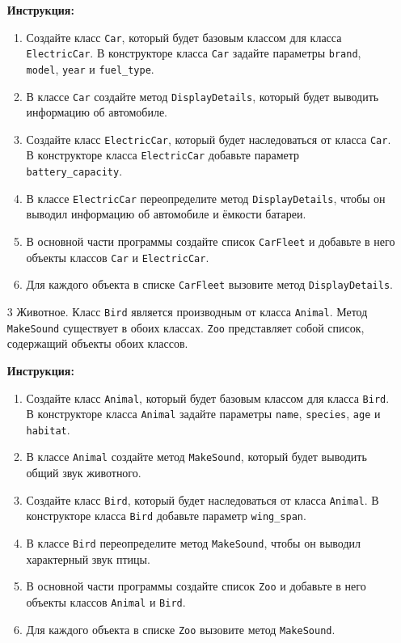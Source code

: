\begin{enumerate}
\textbf{Инструкция:}
\begin{enumerate}
    \item Создайте класс \texttt{Car}, который будет базовым классом для класса \texttt{ElectricCar}. В конструкторе класса \texttt{Car} задайте параметры \texttt{brand}, \texttt{model}, \texttt{year} и \texttt{fuel\_type}.
    \item В классе \texttt{Car} создайте метод \texttt{DisplayDetails}, который будет выводить информацию об автомобиле.
    \item Создайте класс \texttt{ElectricCar}, который будет наследоваться от класса \texttt{Car}. В конструкторе класса \texttt{ElectricCar} добавьте параметр \texttt{battery\_capacity}.
    \item В классе \texttt{ElectricCar} переопределите метод \texttt{DisplayDetails}, чтобы он выводил информацию об автомобиле и ёмкости батареи.
    \item В основной части программы создайте список \texttt{CarFleet} и добавьте в него объекты классов \texttt{Car} и \texttt{ElectricCar}.
    \item Для каждого объекта в списке \texttt{CarFleet} вызовите метод \texttt{DisplayDetails}.
\end{enumerate}

\item[3]
Животное. Класс \texttt{Bird} является производным от класса \texttt{Animal}. Метод \texttt{MakeSound} существует в обоих классах. \texttt{Zoo} представляет собой список, содержащий объекты обоих классов.

\textbf{Инструкция:}
\begin{enumerate}
    \item Создайте класс \texttt{Animal}, который будет базовым классом для класса \texttt{Bird}. В конструкторе класса \texttt{Animal} задайте параметры \texttt{name}, \texttt{species}, \texttt{age} и \texttt{habitat}.
    \item В классе \texttt{Animal} создайте метод \texttt{MakeSound}, который будет выводить общий звук животного.
    \item Создайте класс \texttt{Bird}, который будет наследоваться от класса \texttt{Animal}. В конструкторе класса \texttt{Bird} добавьте параметр \texttt{wing\_span}.
    \item В классе \texttt{Bird} переопределите метод \texttt{MakeSound}, чтобы он выводил характерный звук птицы.
    \item В основной части программы создайте список \texttt{Zoo} и добавьте в него объекты классов \texttt{Animal} и \texttt{Bird}.
    \item Для каждого объекта в списке \texttt{Zoo} вызовите метод \texttt{MakeSound}.
\end{enumerate}


\end{enumerate}
